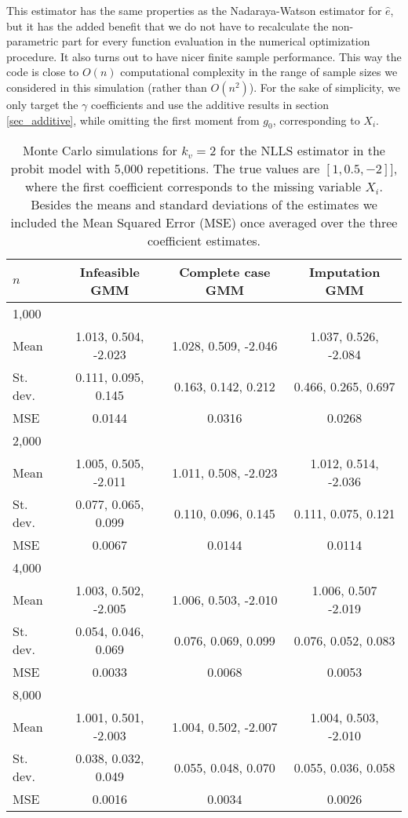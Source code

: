 \documentclass{article}
\theoremstyle{definition}
\theoremstyle{remark}
\begin{document}
This estimator has the same properties as the Nadaraya-Watson estimator for $\hat{e}$, but it has the added benefit that we do not have to recalculate the non-parametric part for every function evaluation in the numerical optimization procedure. {\color{red} It also turns out to have nicer finite sample performance.} This way the code is close to $O(n)$ computational complexity in the range of sample sizes we considered in this simulation (rather than $O(n^2)$). For the sake of simplicity, we only target the $\gamma$ coefficients and use the additive results in section \ref{sec_additive}, while omitting the first moment from $g_0$, corresponding to $X_i$.

\begin{table}
\begin{tabular}{l|c|c|c}
	$n$  & Infeasible GMM & Complete case GMM & Imputation GMM \\
\hline
\hline
1,000 &&& \\  Mean & 1.013,  0.504, -2.023 & 1.028,  0.509, -2.046 & 1.037,   0.526, -2.084 \\
	   St. dev. & 0.111, 0.095, 0.145 & 0.163, 0.142, 0.212 & 0.466, 0.265, 0.697\\
	  MSE & 0.0144 & 0.0316 & {\color{red}0.0268} \\
\hline
2,000 &&& \\  Mean & 1.005,  0.505, -2.011& 1.011,  0.508, -2.023 & 1.012,  0.514, -2.036 \\
 St. dev. & 0.077, 0.065, 0.099 & 0.110, 0.096,  0.145 & 0.111, 0.075, 0.121 \\
 MSE & 0.0067 & 0.0144 & 0.0114 \\
\hline
4,000 &&&\\  Mean & 1.003,  0.502, -2.005 & 1.006, 0.503, -2.010 & 1.006,  0.507 -2.019 \\
 St. dev. & 0.054, 0.046, 0.069 & 0.076, 0.069, 0.099 & 0.076, 0.052, 0.083 \\
  MSE & 0.0033 & 0.0068 & 0.0053 \\
\hline
8,000 &&&\\  Mean & 1.001,  0.501, -2.003 & 1.004,  0.502, -2.007 & 1.004,  0.503, -2.010 \\
 St. dev. & 0.038,  0.032, 0.049 & 0.055, 0.048, 0.070 & 0.055, 0.036, 0.058 \\
 MSE & 0.0016 & 0.0034 & 0.0026
\end{tabular}
\caption{Monte Carlo simulations for $k_v=2$ for the NLLS estimator in the probit model with 5,000 repetitions. The true values are $[1, 0.5, -2]$], where the first coefficient corresponds to the missing variable $X_i$. Besides the means and standard deviations of the estimates we included the Mean Squared Error (MSE) once averaged over the three coefficient estimates.}\label{tab_workingSimulation}
\end{table}
\end{document}
